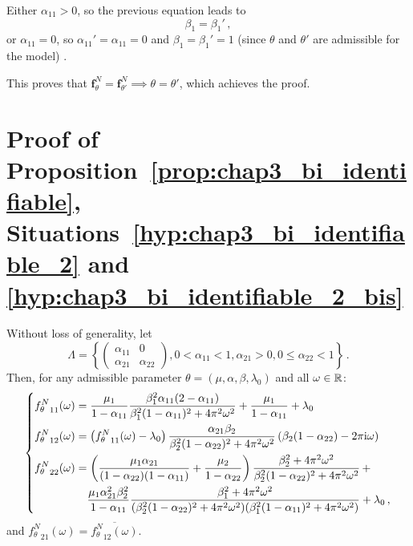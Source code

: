 \begin{subappendices}
Either $\alpha_{11} > 0$, so the previous equation leads to
\[
\beta_1 = \beta_1' \,,
\]
or $\alpha_{11} = 0$, so $\alpha_{11}' = \alpha_{11} = 0$ and $\beta_1 = \beta_1' = 1$ (since $\theta$ and $\theta'$ are admissible for the model) .

This proves that $\mathbf{f}_\theta^N = \mathbf{f}_{\theta'}^N \implies \theta = \theta'$, which achieves the proof.






\section{Proof of Proposition~\ref{prop:chap3_bi_identifiable}, Situations~\ref{hyp:chap3_bi_identifiable_2} and \ref{hyp:chap3_bi_identifiable_2_bis}}\label{appendix:chap3_bi_identifiable_2}

Without loss of generality, let
\[\Lambda = \left\{ \begin{pmatrix} \alpha_{11} & 0 \\ \alpha_{21} & \alpha_{22} \end{pmatrix}, 0 < \alpha_{11} < 1, \alpha_{21} > 0 , 0 \le \alpha_{22} < 1 \right\}\,.\]
Then, for any admissible parameter $\theta = (\mu, \alpha, \beta, \lambda_0)$ and all $\omega\in{\mathbb R}$:
\[\begin{dcases}
{f_\theta^N}_{11}(\omega) = \dfrac{\mu_1}{1-\alpha_{11}} \dfrac{\beta_1^2 \alpha_{11}(2-\alpha_{11})}{\beta_1^2(1-\alpha_{11})^2 + 4 \pi^2\omega^2} + \dfrac{\mu_1}{1-\alpha_{11}} + \lambda_0\\
{f_\theta^N}_{12}(\omega) = \left( {f_\theta^N}_{11}(\omega) - \lambda_0 \right) \dfrac{\alpha_{21} \beta_2}{\beta_2^2(1-\alpha_{22})^2 + 4\pi^2\omega^2}\left(\beta_2(1-\alpha_{22}) - 2 \pi \iu \omega\right)\\
{f_\theta^N}_{22}(\omega) = \left( \dfrac{\mu_1 \alpha_{21}}{(1-\alpha_{22})(1-\alpha_{11})} + \dfrac{\mu_2}{1-\alpha_{22}} \right)\dfrac{\beta_2^2 + 4\pi^2\omega^2}{\beta_2^2(1-\alpha_{22})^2 + 4\pi^2\omega^2} \,+ \\
\phantom{{f_\theta^N}_{22}(\omega) = } \dfrac{\mu_1 \alpha_{21}^2 \beta_2^2 }{1-\alpha_{11}} \dfrac{\beta_1^2 + 4\pi^2\omega^2}{(\beta_2^2(1-\alpha_{22})^2 + 4\pi^2\omega^2)(\beta_1^2(1-\alpha_{11})^2 + 4\pi^2\omega^2)} + \lambda_0\,,
\end{dcases}
\]
and ${f_\theta^N}_{21}(\omega) = \overline{{f_\theta^N}_{12}(\omega)}$.


\end{subappendices}
